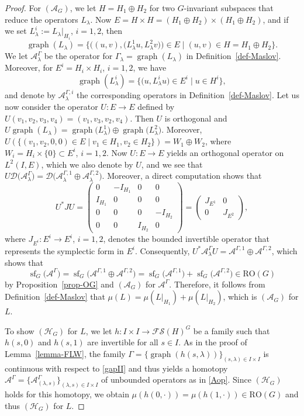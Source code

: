 \documentclass[pdftex]{sigma}
\numberwithin{equation}{section}
\theoremstyle{definition}
\DeclareMathOperator{\sfl}{sf}
\DeclareMathOperator{\gra}{graph}
\begin{document}
\begin{proof}
For $(\mathcal{A}_G)$, we let $H=H_1\oplus H_2$ for two $G$-invariant subspaces that reduce the operators $L_\lambda$. Now $E=H\times H=(H_1\oplus H_2)\times (H_1\oplus H_2)$, and if we set $L^i_\lambda:=L_\lambda|_{H_i}$, $i=1,2$, then
\[\gra(L_\lambda)=\bigl\{\bigl((u,v),\bigl(L^1_\lambda u,L^2_\lambda v\bigr)\bigr)\in E \mid (u,v)\in H=H_1\oplus H_2\bigr\}.\]
We let $\mathcal{A}^\Gamma_\lambda$ be the operator for $\Gamma_\lambda=\gra(L_\lambda)$ in Definition~\ref{def-Maslov}. Moreover, for $E^i=H_i\times H_i$, $i=1,2$, we have
\[\gra(L^i_\lambda)=\bigl\{\bigl(u,L^i_\lambda u\bigr)\in E^i \mid u\in H^i\bigr\},\]
and denote by $\mathcal{A}^{\Gamma,i}_\lambda$ the corresponding operators in Definition~\ref{def-Maslov}. Let us now consider the operator $U \colon E\rightarrow E$ defined by $U(v_1,v_2,v_3,v_4)=(v_1,v_3,v_2,v_4)$. Then $U$ is orthogonal and $U\gra(L_\lambda)=\gra\bigl(L^1_\lambda\bigr)\oplus\gra\bigl(L^2_\lambda\bigr)$. Moreover, $U(\{(v_1,v_2,0,0)\in E \mid v_1\in H_1, v_2\in H_2\})=W_1\oplus W_2$, where $W_i=H_i\times\{0\}\subset E^i$, $i=1,2$. Now $U \colon
E\rightarrow E$ yields an orthogonal operator on $L^2(I,E)$, which we also denote by $U$, and we see that $U\mathcal{D}\bigl(\mathcal{A}^\Gamma_\lambda\bigr)=\mathcal{D}\bigl(\mathcal{A}^{\Gamma,1}_\lambda\oplus\mathcal{A}^{\Gamma,2}_\lambda\bigr)$. Moreover, a direct computation shows that
\[U^\ast JU=\begin{pmatrix}
0&-I_{H_1}&0&0\\
I_{H_1}&0&0&0\\
0&0&0&-I_{H_2}\\
0&0&I_{H_2}&0
\end{pmatrix}=\begin{pmatrix}
J_{E^1}&0\\
0&J_{E^2}
\end{pmatrix},\]
where $J_{E^i} \colon E^i\rightarrow E^i$, $i=1,2$, denotes the bounded invertible operator that represents the symplectic form in $E^i$. Consequently, $U^\ast\mathcal{A}^\Gamma_\lambda U=\mathcal{A}^{\Gamma,1}\oplus\mathcal{A}^{\Gamma,2}$, which shows that
\[\sfl_G\bigl(\mathcal{A}^\Gamma\bigr)=\sfl_G\bigl(\mathcal{A}^{\Gamma,1}\oplus\mathcal{A}^{\Gamma,2}\bigr) =\sfl_G\bigl(\mathcal{A}^{\Gamma,1}\bigr)+\sfl_G\bigl(\mathcal{A}^{\Gamma,2}\bigr)\in \mathrm{RO}(G)\]
by Proposition~\ref{prop-OG} and $(\mathcal{A}_G)$ for $\mathcal{A}^\Gamma$. Therefore, it follows from Definition~\ref{def-Maslov} that $\mu(L)=\mu(L|_{H_1}) +\mu(L|_{H_2})$, which is $(\mathcal{A}_G)$ for $L$.

To show $(\mathcal{H}_G)$ for $L$, we let $h\colon I\times I\rightarrow\mathcal{FS}(H)^G$ be a family such that $h(s,0)$ and $h(s,1)$ are invertible for all $s\in I$. As in the proof of Lemma~\ref{lemma-FLW}, the family $\Gamma=\{\gra(h(s,\lambda))\}_{(s,\lambda)\in I\times I}$ is continuous with respect to \eqref{gapII} and thus yields a homotopy $\mathcal{A}^\Gamma=\bigl\{\mathcal{A}^\Gamma_{(\lambda,s)}\bigr\}_{(\lambda,s)\in I\times I}$ of unbounded operators as in \eqref{Aop}. Since $(\mathcal{H}_G)$ holds for this homotopy, we obtain $\mu(h(0,\cdot))=\mu(h(1,\cdot))\in \mathrm{RO}(G)$ and thus $(\mathcal{H}_G)$ for $L$.


\end{proof}
\end{document}

